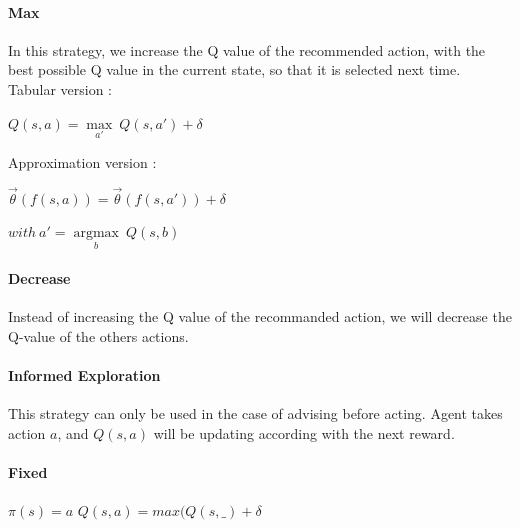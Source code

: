 \documentclass[a4paper,12pt]{article}
\begin{document}
      \paragraph{Max} In this strategy, we increase the Q value of the recommended action, 
      with the best possible Q value in the current state, so that it is selected next time. 
      \newline
      Tabular version :
      \begin{center}
       $Q(s,a) = \underset{a'}{\operatorname{max}}\ Q(s,a') + \delta$
      \end{center}
      Approximation version :
      \begin{center}
	$\vec\theta(f(s,a)) = \vec\theta(f(s,a')) + \delta$
	
	$with\ a' = \underset{b}{\operatorname{argmax}}\ Q(s,b) $ 
	\end{center}
       
       \paragraph{Decrease} Instead of increasing the Q value of the recommanded action, we will decrease
       the Q-value of the others actions.
       
       
       \paragraph{Informed Exploration}
       This strategy can only be used in the case of advising before acting. Agent takes action $a$,
       and $Q(s,a)$ will be updating according with the next reward.
       
       
       
       \paragraph{Fixed} 
	$\pi(s)=a$ \newline
	$Q(s,a) = max(Q(s,\_) + \delta$
\end{document}

